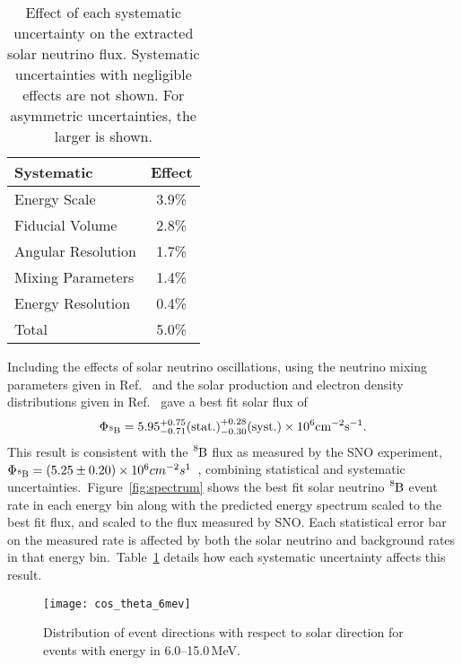 \begin{table}
\begin{center}
\begin{tabular}{l c}
\hline
\hline
Systematic & Effect \\
\hline
Energy Scale & 3.9\% \\
Fiducial Volume & 2.8\% \\
Angular Resolution & 1.7\% \\
Mixing Parameters & 1.4\% \\
Energy Resolution & 0.4\% \\
\hline
Total & 5.0\%\\
\hline
\hline
\end{tabular}
\caption{Effect of each systematic uncertainty on the extracted solar neutrino
         flux. Systematic uncertainties with negligible effects
         are not shown. For asymmetric uncertainties, the larger is shown.}
\label{table:systematics}
\end{center}
\end{table}

Including the effects of solar neutrino oscillations, using the neutrino mixing
parameters given in Ref.~\citep{pdg16} and the solar production and electron
density distributions given in Ref.~\citep{bs_ssm} gave a best fit solar flux
of
\begin{equation*}
    \Phi_{\ce{^{8}B}}= 5.95^{+0.75}_{-0.71}\text{(stat.)}^{+0.28}_{-0.30}\text{(syst.)}\times10^{6}\text{cm}^{-2}\text{s}^{-1}\text{.}
\end{equation*}
This result is consistent with the $\ce{^{8}B}$ flux as measured by the SNO experiment,
$\Phi_{\ce{^{8}B}}=\left(5.25\pm0.20\right)\times10^{6}cm^{-2}s^{1}$~\citep{sno_combined}, combining statistical
and systematic uncertainties.\
Figure~\ref{fig:spectrum} shows the best fit solar neutrino $\ce{^{8}B}$ event rate in each
energy bin along with the predicted energy spectrum scaled to the best fit
flux, and scaled to the flux measured by SNO\@. Each statistical error bar on the
measured rate is affected by both the solar neutrino and background rates in that
energy bin.\
Table~\ref{table:systematics} details how each systematic uncertainty affects this result.\

\begin{figure}[htbp]
    \centering
\texttt{[image: cos\_theta\_6mev]}%
\caption{Distribution of event directions with respect to solar direction for
    events with energy in \numrange[range-phrase=--]{6.0}{15.0}\,MeV.}
\label{fig:cos_theta_six}
\end{figure}

